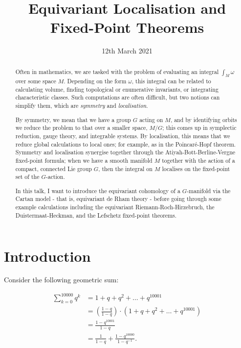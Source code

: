 \documentclass{article}
\title{Equivariant Localisation and Fixed-Point Theorems}
\date{12th March 2021}	%
\newcommand{\w}{\omega}
\begin{document}
\maketitle

\begin{abstract}

Often in mathematics, we are tasked with the problem of evaluating an integral $\int_{M} \w$ over some space $M$. Depending on the form $\w$, this integral can be related to calculating volume, finding topological or enumerative invariants, or integrating characteristic classes. Such computations are often difficult, but two notions can simplify them, which are \emph{symmetry} and \emph{localisation}.

By symmetry, we mean that we have a group $G$ acting on $M$, and by identifying orbits we reduce the problem to that over a smaller space, $M/G$; this comes up in symplectic reduction, gauge theory, and integrable systems. By localisation, this means that we reduce global calculations to local ones; for example, as in the Poincaré-Hopf theorem. Symmetry and localisation synergise together through the Atiyah-Bott-Berline-Vergne fixed-point formula; when we have a smooth manifold $M$ together with the action of a compact, connected Lie group $G$, then the integral on $M$ localises on the ﬁxed-point set of the $G$-action.

In this talk, I want to introduce the equivariant cohomology of a $G$-manifold via the Cartan model - that is, equivariant de Rham theory - before going through some example calculations including the equivariant Riemann-Roch-Hirzebruch, the Duistermaat-Heckman, and the Lefschetz fixed-point theorems.

\end{abstract}

\section{Introduction}

Consider the following geometric sum:

\begin{equation*}
	\begin{split}
		\sum\limits_{k=0}^{10000} q^{k} &= 1 + q + q^{2} + \ldots + q^{10001} \\
		&= \left(\frac{1-q}{1-q}\right)\cdot(1 + q + q^{2} + \ldots + q^{10001}) \\
		&= \frac{1 - q^{10001}}{1 - q} \\
		&= \frac{1}{1 - q} + \frac{1 - q^{10000}}{1 - q^{-1}}.
	\end{split}
\end{equation*}
\end{document}
